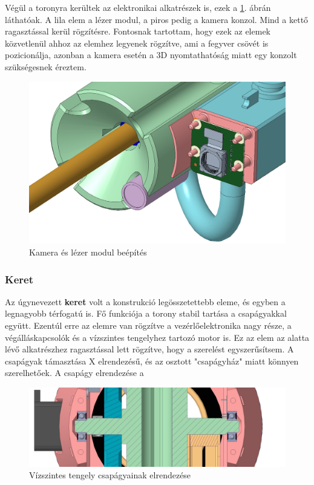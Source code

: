 \documentclass[12pt,a4paper]{article}
\begin{document}
Végül a toronyra kerültek az elektronikai alkatrészek is, ezek a \ref{fig:mech_dt4000kamera}. ábrán láthatóak. A lila elem a lézer modul, a piros pedig a kamera konzol. Mind a kettő ragasztással kerül rögzítésre. Fontosnak tartottam, hogy ezek az elemek közvetlenül ahhoz az elemhez legyenek rögzítve, ami a fegyver csövét is pozicionálja, azonban a kamera esetén a 3D nyomtathatóság miatt egy konzolt szükségesnek éreztem.

\begin{figure}[h!]
	\centering
	\includegraphics[width=1\linewidth]{mech_dt4000kamera}
	\caption{Kamera és lézer modul beépítés}
	\label{fig:mech_dt4000kamera}
\end{figure}

\subsubsection{Keret}
Az úgynevezett \textbf{keret} volt a konstrukció legösszetettebb eleme, és egyben a legnagyobb térfogatú is. Fő funkciója a torony stabil tartása a csapágyakkal együtt. Ezentúl erre az elemre van rögzítve a vezérlőelektronika nagy része, a végálláskapcsolók és a vízszintes tengelyhez tartozó motor is. Ez az elem az alatta lévő alkatrészhez ragasztással lett rögzítve, hogy a szerelést egyszerűsítsem. A csapágyak támasztása X elrendezésű, és az osztott "csapágyház" miatt könnyen szerelhetőek. A csapágy elrendezése  a

\begin{figure}[h!]
	\centering
	\includegraphics[width=1\linewidth]{mech_felsotengely}
	\caption{Vízszintes tengely csapágyainak elrendezése}
	\label{fig:mech_felsotengely}
\end{figure}
\end{document}
